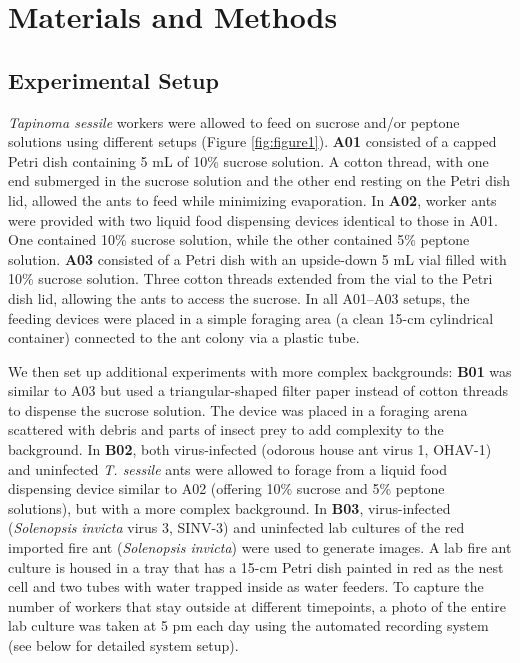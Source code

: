 
\section{Materials and Methods}

\subsection{Experimental Setup}

\emph{Tapinoma sessile} workers were allowed to feed on sucrose and/or peptone solutions using different setups (Figure \ref{fig:figure1}). \textbf{A01} consisted of a capped Petri dish containing 5 mL of 10\% sucrose solution. A cotton thread, with one end submerged in the sucrose solution and the other end resting on the Petri dish lid, allowed the ants to feed while minimizing evaporation. In \textbf{A02}, worker ants were provided with two liquid food dispensing devices identical to those in A01. One contained 10\% sucrose solution, while the other contained 5\% peptone solution. \textbf{A03} consisted of a Petri dish with an upside-down 5 mL vial filled with 10\% sucrose solution. Three cotton threads extended from the vial to the Petri dish lid, allowing the ants to access the sucrose. In all A01--A03 setups, the feeding devices were placed in a simple foraging area (a clean 15-cm cylindrical container) connected to the ant colony via a plastic tube.

We then set up additional experiments with more complex backgrounds: \textbf{B01} was similar to A03 but used a triangular-shaped filter paper instead of cotton threads to dispense the sucrose solution. The device was placed in a foraging arena scattered with debris and parts of insect prey to add complexity to the background. In \textbf{B02}, both virus-infected (odorous house ant virus 1, OHAV-1) and uninfected \emph{T. sessile} ants were allowed to forage from a liquid food dispensing device similar to A02 (offering 10\% sucrose and 5\% peptone solutions), but with a more complex background. In \textbf{B03}, virus-infected (\emph{Solenopsis invicta} virus 3, SINV-3) and uninfected lab cultures of the red imported fire ant (\emph{Solenopsis invicta}) were used to generate images. A lab fire ant culture is housed in a tray that has a 15-cm Petri dish painted in red as the nest cell and two tubes with water trapped inside as water feeders. To capture the number of workers that stay outside at different timepoints, a photo of the entire lab culture was taken at 5 pm each day using the automated recording system (see below for detailed system setup).

